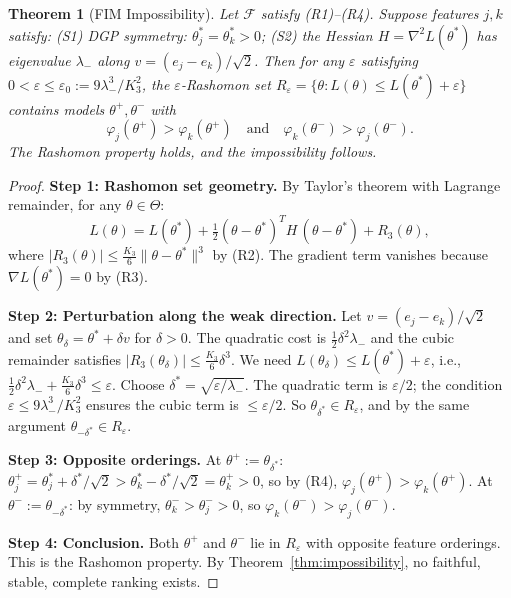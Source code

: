 \documentclass{article}
\newtheorem{theorem}{Theorem}
\begin{document}
\begin{theorem}[FIM Impossibility]
\label{thm:fim-impossibility}
Let $\mathcal{F}$ satisfy (R1)--(R4). Suppose features $j, k$ satisfy: (S1) DGP symmetry: $\theta^*_j = \theta^*_k > 0$; (S2) the Hessian $H = \nabla^2 L(\theta^*)$ has eigenvalue $\lambda_-$ along $v = (e_j - e_k)/\sqrt{2}$. Then for any $\varepsilon$ satisfying $0 < \varepsilon \leq \varepsilon_0 := 9\lambda_-^3/K_3^2$, the $\varepsilon$-Rashomon set $R_\varepsilon = \{\theta : L(\theta) \leq L(\theta^*) + \varepsilon\}$ contains models $\theta^+, \theta^-$ with
\[
    \varphi_j(\theta^+) > \varphi_k(\theta^+) \quad\text{and}\quad \varphi_k(\theta^-) > \varphi_j(\theta^-).
\]
The Rashomon property holds, and the impossibility follows.
\end{theorem}

\begin{proof}
\textbf{Step 1: Rashomon set geometry.}
By Taylor's theorem with Lagrange remainder, for any $\theta \in \Theta$:
\[
    L(\theta) = L(\theta^*) + \tfrac{1}{2}(\theta - \theta^*)^T H\, (\theta - \theta^*) + R_3(\theta),
\]
where $|R_3(\theta)| \leq \frac{K_3}{6}\|\theta - \theta^*\|^3$ by (R2). The gradient term vanishes because $\nabla L(\theta^*) = 0$ by (R3).

\textbf{Step 2: Perturbation along the weak direction.}
Let $v = (e_j - e_k)/\sqrt{2}$ and set $\theta_\delta = \theta^* + \delta v$ for $\delta > 0$. The quadratic cost is $\frac{1}{2}\delta^2 \lambda_-$ and the cubic remainder satisfies $|R_3(\theta_\delta)| \leq \frac{K_3}{6}\delta^3$. We need $L(\theta_\delta) \leq L(\theta^*) + \varepsilon$, i.e., $\frac{1}{2}\delta^2 \lambda_- + \frac{K_3}{6}\delta^3 \leq \varepsilon$. Choose $\delta^* = \sqrt{\varepsilon/\lambda_-}$. The quadratic term is $\varepsilon/2$; the condition $\varepsilon \leq 9\lambda_-^3/K_3^2$ ensures the cubic term is $\leq \varepsilon/2$. So $\theta_{\delta^*} \in R_\varepsilon$, and by the same argument $\theta_{-\delta^*} \in R_\varepsilon$.

\textbf{Step 3: Opposite orderings.}
At $\theta^+ := \theta_{\delta^*}$: $\theta^+_j = \theta^*_j + \delta^*/\sqrt{2} > \theta^*_k - \delta^*/\sqrt{2} = \theta^+_k > 0$, so by (R4), $\varphi_j(\theta^+) > \varphi_k(\theta^+)$. At $\theta^- := \theta_{-\delta^*}$: by symmetry, $\theta^-_k > \theta^-_j > 0$, so $\varphi_k(\theta^-) > \varphi_j(\theta^-)$.

\textbf{Step 4: Conclusion.}
Both $\theta^+$ and $\theta^-$ lie in $R_\varepsilon$ with opposite feature orderings. This is the Rashomon property. By Theorem~\ref{thm:impossibility}, no faithful, stable, complete ranking exists.
\end{proof}
\end{document}
